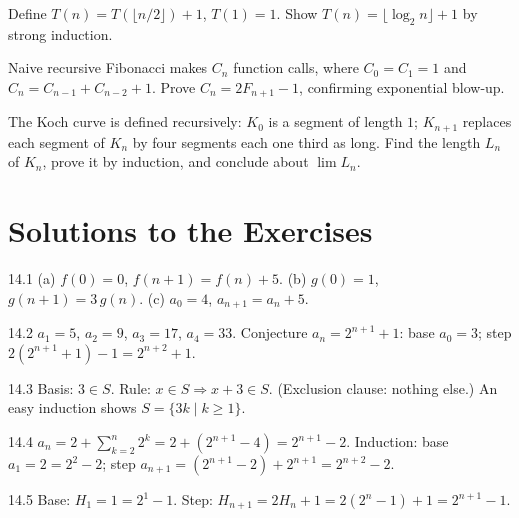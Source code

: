 \begin{exercise}{\hard}
Define $T(n) = T(\lfloor n/2 \rfloor) + 1$, $T(1) = 1$. Show
$T(n) = \lfloor \log_2 n \rfloor + 1$ by strong induction.
\end{exercise}

\begin{exercise}{\hard}
Naive recursive Fibonacci makes $C_n$ function calls, where $C_0 = C_1 = 1$
and $C_n = C_{n-1} + C_{n-2} + 1$. Prove $C_n = 2F_{n+1} - 1$, confirming
exponential blow-up.
\end{exercise}

\begin{exercise}{\hard}
The Koch curve is defined recursively: $K_0$ is a segment of length $1$;
$K_{n+1}$ replaces each segment of $K_n$ by four segments each one third as
long. Find the length $L_n$ of $K_n$, prove it by induction, and conclude
about $\lim L_n$.
\end{exercise}

\section*{Solutions to the Exercises}

\begin{solution}{14.1}
(a) $f(0) = 0$, $f(n+1) = f(n) + 5$.
(b) $g(0) = 1$, $g(n+1) = 3\,g(n)$.
(c) $a_0 = 4$, $a_{n+1} = a_n + 5$.
\end{solution}

\begin{solution}{14.2}
$a_1 = 5$, $a_2 = 9$, $a_3 = 17$, $a_4 = 33$. Conjecture
$a_n = 2^{n+1} + 1$: base $a_0 = 3$; step
$2(2^{n+1} + 1) - 1 = 2^{n+2} + 1$. \checkmark
\end{solution}

\begin{solution}{14.3}
Basis: $3 \in S$. Rule: $x \in S \Rightarrow x + 3 \in S$. (Exclusion
clause: nothing else.) An easy induction shows $S = \{3k \mid k \ge 1\}$.
\end{solution}

\begin{solution}{14.4}
$a_n = 2 + \sum_{k=2}^{n} 2^{k} = 2 + (2^{n+1} - 4) = 2^{n+1} - 2$.
Induction: base $a_1 = 2 = 2^2 - 2$; step
$a_{n+1} = (2^{n+1} - 2) + 2^{n+1} = 2^{n+2} - 2$.
\end{solution}

\begin{solution}{14.5}
Base: $H_1 = 1 = 2^1 - 1$. Step:
$H_{n+1} = 2H_n + 1 = 2(2^{n} - 1) + 1 = 2^{n+1} - 1$.
\end{solution}

